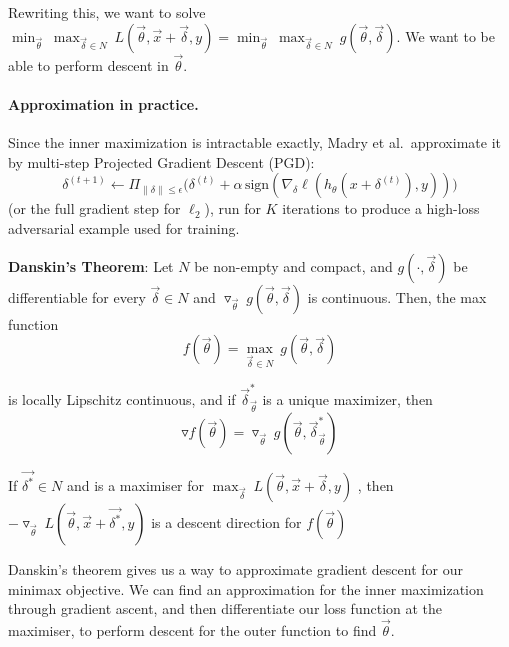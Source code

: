\documentclass[11pt]{report}
\begin{document}
\noindent Rewriting this, we want to solve $\min_{\vec{\theta}} \  \max_{\vec{\delta} \in N} \ L(\vec{\theta},\vec{x}+\vec{\delta},y) = \min_{\vec{\theta}} \  \max_{\vec{\delta} \in N} \  g(\vec{\theta}, \vec{\delta})$. We want to be able to perform descent in $\vec{\theta}$.

\paragraph{Approximation in practice.}
Since the inner maximization is intractable exactly, Madry et al.\ approximate it by multi-step Projected Gradient Descent (PGD):
\[
\delta^{(t+1)} \leftarrow \Pi_{\|\delta\|\le\epsilon}\big(\delta^{(t)} + \alpha\,\mathrm{sign}(\nabla_\delta \ell(h_\theta(x+\delta^{(t)}),y))\big)
\]
(or the full gradient step for \(\ell_2\)), run for \(K\) iterations to produce a high-loss adversarial example used for training.
\begin{theorem}\label{Danskin}
\textbf{Danskin's Theorem}: Let $N$ be non-empty and compact, and $g(\cdot,\vec{\delta})$ be differentiable for every $\vec{\delta} \in N$ and $\triangledown_{\vec{\theta}} \ g(\vec{\theta}, \vec{\delta})$ is continuous. Then, the max function
\[
    f(\vec{\theta}) = \max_{\vec{\delta} \in N} \  g(\vec{\theta}, \vec{\delta})
\]

\noindent is locally Lipschitz continuous, and if $\vec{\delta}_{\vec{\theta}}^*$ is a unique maximizer, then 
\[
     \triangledown f(\vec{\theta}) = \triangledown_{\vec\theta} \ g(\vec{\theta}, \vec{\delta}_{\vec{\theta}}^*)
\]
\end{theorem}

\begin{corollary}
If $\vec{\delta^*} \in N$ and is a maximiser for
$\max_{\vec{\delta}} \ L(\vec{\theta}, \vec{x}+\vec{\delta}, y)$
, then
$-\triangledown_{\vec{\theta}} \  L(\vec{\theta}, \vec{x}+\vec{\delta^*}, y)$ is a descent direction for $f(\vec{\theta})$
\end{corollary}

\noindent Danskin's theorem gives us a way to approximate gradient descent for our minimax objective. We can find an approximation for the inner maximization through gradient ascent, and then differentiate our loss function at the maximiser, to perform descent for the outer function to find $\vec{\theta}$. 

\begin{algorithm2e}[H]
\DontPrintSemicolon
{}
\caption{Empirical Adversarial Training (Madry et al.)}
\label{alg:madry_pgd}
\end{algorithm2e}
\end{document}
